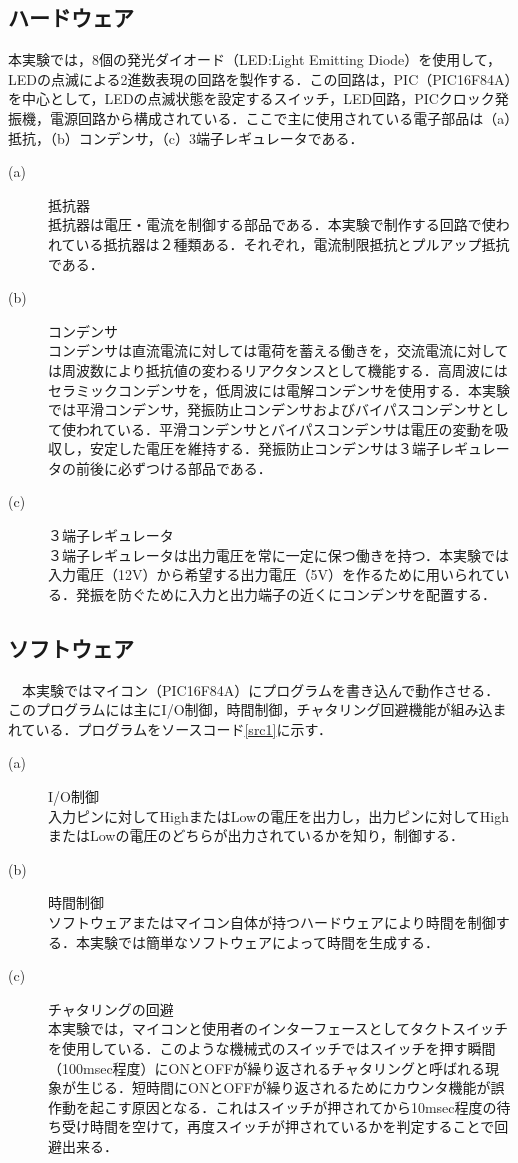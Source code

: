 \documentclass[11pt,a4paper]{jsarticle}
\begin{document}
\subsection{ハードウェア}
本実験では，8個の発光ダイオード（LED:Light Emitting Diode）を使用して，LEDの点滅による2進数表現の回路を製作する．この回路は，PIC（PIC16F84A）を中心として，LEDの点滅状態を設定するスイッチ，LED回路，PICクロック発振機，電源回路から構成されている．ここで主に使用されている電子部品は（a）抵抗，（b）コンデンサ，（c）3端子レギュレータである．
\begin{description}
 \item[(a)] 抵抗器　\\
	    抵抗器は電圧・電流を制御する部品である．本実験で制作する回路で使われている抵抗器は２種類ある．それぞれ，電流制限抵抗とプルアップ抵抗である．
 \item[(b)] コンデンサ \\
	    コンデンサは直流電流に対しては電荷を蓄える働きを，交流電流に対しては周波数により抵抗値の変わるリアクタンスとして機能する．高周波にはセラミックコンデンサを，低周波には電解コンデンサを使用する．本実験では平滑コンデンサ，発振防止コンデンサおよびバイパスコンデンサとして使われている．平滑コンデンサとバイパスコンデンサは電圧の変動を吸収し，安定した電圧を維持する．発振防止コンデンサは３端子レギュレータの前後に必ずつける部品である．
 \item[(c)] ３端子レギュレータ \\
	    ３端子レギュレータは出力電圧を常に一定に保つ働きを持つ．本実験では入力電圧（12V）から希望する出力電圧（5V）を作るために用いられている．発振を防ぐために入力と出力端子の近くにコンデンサを配置する．
\end{description}

\subsection{ソフトウェア}
　本実験ではマイコン（PIC16F84A）にプログラムを書き込んで動作させる．このプログラムには主にI/O制御，時間制御，チャタリング回避機能が組み込まれている．プログラムをソースコード\ref{src1}に示す．
\begin{description}
 \item[(a)] I/O制御 \\
	    入力ピンに対してHighまたはLowの電圧を出力し，出力ピンに対してHighまたはLowの電圧のどちらが出力されているかを知り，制御する．
 \item[(b)] 時間制御 \\
	    ソフトウェアまたはマイコン自体が持つハードウェアにより時間を制御する．本実験では簡単なソフトウェアによって時間を生成する．
 \item[(c)] チャタリングの回避 \\
	    本実験では，マイコンと使用者のインターフェースとしてタクトスイッチを使用している．このような機械式のスイッチではスイッチを押す瞬間（100msec程度）にONとOFFが繰り返されるチャタリングと呼ばれる現象が生じる．短時間にONとOFFが繰り返されるためにカウンタ機能が誤作動を起こす原因となる．これはスイッチが押されてから10msec程度の待ち受け時間を空けて，再度スイッチが押されているかを判定することで回避出来る．
\end{description}
\end{document}
